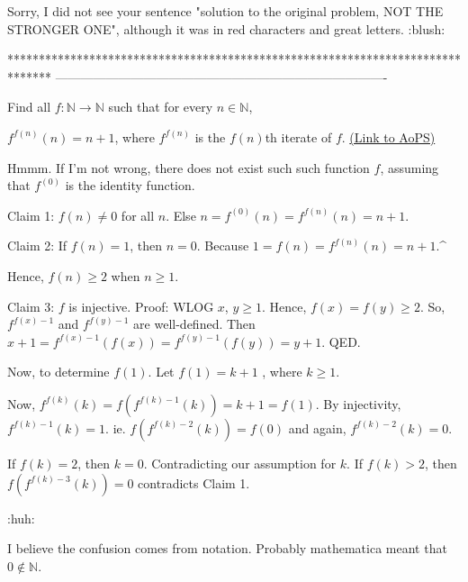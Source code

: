 \begin{solution}
	Sorry, I did not see your sentence "solution to the original problem, NOT THE STRONGER ONE", although it was in red characters and great letters. :blush:
\end{solution}
*******************************************************************************
-------------------------------------------------------------------------------

\begin{problem}
	Find all $f: \mathbb{N}\rightarrow \mathbb{N}$ such that for every $n\in \mathbb{N}$,

$f^{f(n)}(n)=n+1$, where $f^{f(n)}$ is the $f(n)$th iterate of $f$.
	\flushright \href{https://artofproblemsolving.com/community/c6h144434}{(Link to AoPS)}
\end{problem}



\begin{solution}
	Hmmm. If I'm not wrong, there does not exist such such function $f$, assuming that $f^{(0)}$ is the identity function.

Claim 1: $f(n)\ne 0$ for all $n$. Else $n=f^{(0)}(n)=f^{f(n)}(n)=n+1$.

Claim 2: If $f(n)=1$, then $n=0$. Because $1=f(n)=f^{f(n)}(n)=n+1$.^

Hence, $f(n)\ge 2$ when $n\ge 1$.

Claim 3: $f$ is injective. Proof: WLOG $x$, $y\ge 1$. Hence, $f(x)=f(y)\ge 2$.
So, $f^{f(x)-1}$ and $f^{f(y)-1}$ are well-defined. Then $x+1=f^{f(x)-1}(f(x))=f^{f(y)-1}(f(y))=y+1$. QED.

Now, to determine $f(1)$. Let $f(1)=k+1$ , where $k\ge 1$.

Now, $f^{f(k)}(k)=f(f^{f(k)-1}(k))=k+1=f(1)$. By injectivity, $f^{f(k)-1}(k)=1$. ie.  $f(f^{f(k)-2}(k))=f(0)$ and again, $f^{f(k)-2}(k)=0$.

If $f(k)=2$, then $k=0$. Contradicting our assumption for $k$.
If $f(k)>2$, then $f(f^{f(k)-3}(k))=0$ contradicts Claim 1.

 :huh:
\end{solution}



\begin{solution}
	I believe the confusion comes from notation. Probably mathematica meant that $0\notin \mathbb{N}$.
\end{solution}



